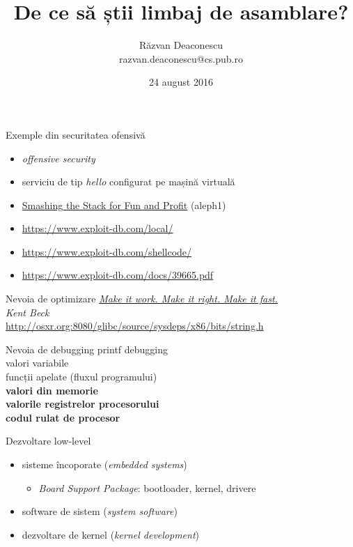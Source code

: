 \documentclass{beamer}
\title[De ce asm?]{De ce să știi limbaj de asamblare?}
\institute{Informatica la Castel 2016 (Macea, Arad)}
\author[Răzvan Deaconescu]{Răzvan Deaconescu \\
razvan.deaconescu@cs.pub.ro}
\date{24 august 2016}
\begin{document}
\frame{\titlepage}

\begin{frame}{Exemple din securitatea ofensivă}
  \begin{itemize}
    \pause \item \textit{offensive security}
    \pause \item serviciu de tip \textit{hello} configurat pe mașină virtuală
    \pause \item \href{http://phrack.org/issues/49/14.html}{Smashing the Stack for Fun and Profit} (aleph1)
    \pause \item \url{https://www.exploit-db.com/local/}
    \pause \item \url{https://www.exploit-db.com/shellcode/}
    \pause \item \url{https://www.exploit-db.com/docs/39665.pdf}
  \end{itemize}
\end{frame}

\begin{frame}{Nevoia de optimizare}
  \centering
  \pause
  \textit{\href{http://c2.com/cgi/wiki?MakeItWorkMakeItRightMakeItFast}{Make it work. Make it right. Make it fast.}} \\
  \vspace{3mm}
  \hfill \textit{Kent Beck} \\
  \pause
  \vspace{1cm}
  \footnotesize{\url{http://osxr.org:8080/glibc/source/sysdeps/x86/bits/string.h}}
\end{frame}

\begin{frame}{Nevoia de debugging}
  \centering
  \pause printf debugging\\
  \pause valori variabile\\
  \pause funcții apelate (fluxul programului)\\
  \pause \textbf{valori din memorie}\\
  \pause \textbf{valorile registrelor procesorului}\\
  \pause \textbf{codul rulat de procesor}\\
\end{frame}

\begin{frame}{Dezvoltare low-level}
  \begin{itemize}
    \pause \item sisteme încoporate (\textit{embedded systems})
      \begin{itemize}
        \pause \item \textit{Board Support Package}: bootloader, kernel, drivere
      \end{itemize}
    \pause \item software de sistem (\textit{system software})
    \pause \item dezvoltare de kernel (\textit{kernel development})
  \end{itemize}
\end{frame}
\end{document}
